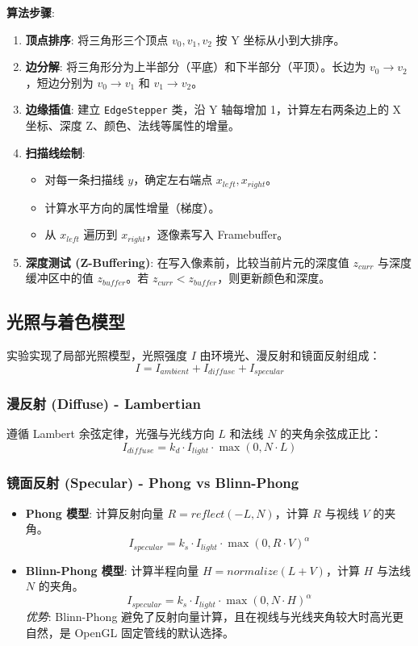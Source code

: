 \documentclass[a4paper]{article}
\begin{document}
\textbf{算法步骤}:
\begin{enumerate}
    \item \textbf{顶点排序}: 将三角形三个顶点 $v_0, v_1, v_2$ 按 Y 坐标从小到大排序。
    \item \textbf{边分解}: 将三角形分为上半部分（平底）和下半部分（平顶）。长边为 $v_0 \to v_2$，短边分别为 $v_0 \to v_1$ 和 $v_1 \to v_2$。
    \item \textbf{边缘插值}: 建立 \texttt{EdgeStepper} 类，沿 Y 轴每增加 1，计算左右两条边上的 X 坐标、深度 Z、颜色、法线等属性的增量。
    \item \textbf{扫描线绘制}:
        \begin{itemize}
            \item 对每一条扫描线 $y$，确定左右端点 $x_{left}, x_{right}$。
            \item 计算水平方向的属性增量（梯度）。
            \item 从 $x_{left}$ 遍历到 $x_{right}$，逐像素写入 Framebuffer。
        \end{itemize}
    \item \textbf{深度测试 (Z-Buffering)}: 在写入像素前，比较当前片元的深度值 $z_{curr}$ 与深度缓冲区中的值 $z_{buffer}$。若 $z_{curr} < z_{buffer}$，则更新颜色和深度。
\end{enumerate}

\subsection{光照与着色模型}
实验实现了局部光照模型，光照强度 $I$ 由环境光、漫反射和镜面反射组成：
\[ I = I_{ambient} + I_{diffuse} + I_{specular} \]

\subsubsection{漫反射 (Diffuse) - Lambertian}
遵循 Lambert 余弦定律，光强与光线方向 $L$ 和法线 $N$ 的夹角余弦成正比：
\[ I_{diffuse} = k_d \cdot I_{light} \cdot \max(0, N \cdot L) \]

\subsubsection{镜面反射 (Specular) - Phong vs Blinn-Phong}
\begin{itemize}
    \item \textbf{Phong 模型}: 计算反射向量 $R = reflect(-L, N)$，计算 $R$ 与视线 $V$ 的夹角。
    \[ I_{specular} = k_s \cdot I_{light} \cdot \max(0, R \cdot V)^{\alpha} \]
    \item \textbf{Blinn-Phong 模型}: 计算半程向量 $H = normalize(L + V)$，计算 $H$ 与法线 $N$ 的夹角。
    \[ I_{specular} = k_s \cdot I_{light} \cdot \max(0, N \cdot H)^{\alpha} \]
    \textit{优势}: Blinn-Phong 避免了反射向量计算，且在视线与光线夹角较大时高光更自然，是 OpenGL 固定管线的默认选择。
\end{itemize}
\end{document}
